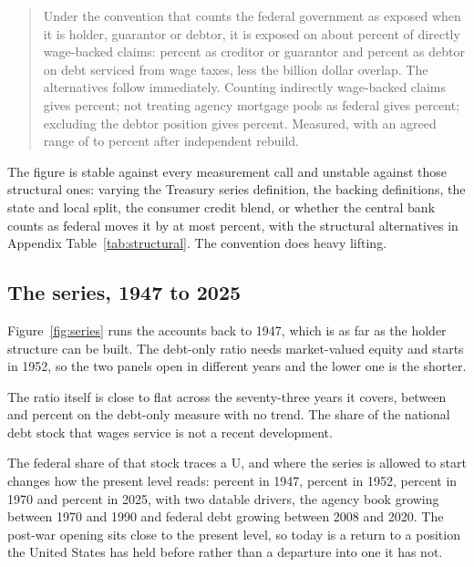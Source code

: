 \begin{quote}
Under the convention that counts the federal government as exposed when it is holder, guarantor
or debtor, it is exposed on about  percent of directly wage-backed claims:
 percent as creditor or guarantor and  percent
as debtor on debt serviced from wage taxes, less the  billion dollar overlap.
The alternatives follow immediately. Counting indirectly wage-backed claims gives
 percent; not treating agency mortgage pools as federal gives
 percent; excluding the debtor position gives
 percent. Measured, with an agreed range of
 to  percent after independent rebuild.
\end{quote}

The figure is stable against every measurement call and unstable against those structural ones:
varying the Treasury series definition, the backing definitions, the state and local split, the
consumer credit blend, or whether the central bank counts as federal moves it by at most
 percent, with the structural alternatives in Appendix
Table~\ref{tab:structural}. The convention does heavy lifting.

\subsection{The series, 1947 to 2025}

Figure~\ref{fig:series} runs the accounts back to 1947, which is as far as the holder structure
can be built. The debt-only ratio needs market-valued equity and starts in 1952, so the two
panels open in different years and the lower one is the shorter.

The ratio itself is close to flat across the seventy-three years it covers, between
 and  percent on the debt-only measure with
no trend. The share of the national debt stock that wages service is not a recent development.

The federal share of that stock traces a U, and where the series is allowed to start changes how
the present level reads:  percent in 1947,  percent in
1952,  percent in 1970 and  percent in 2025, with two
datable drivers, the agency book growing between 1970 and 1990 and federal debt growing between
2008 and 2020. The post-war opening sits close to the present level, so today is a return to a
position the United States has held before rather than a departure into one it has not.

